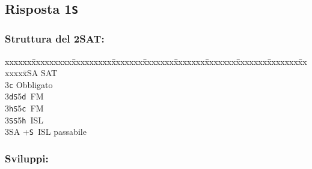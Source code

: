 \documentclass[a4paper,italian]{article}
\newcommand{\BS}{\small{\texttt{S}}}
\newcommand{\BC}{\small{\texttt{c}}}
\newcommand{\BD}{\small{\texttt{d}}}
\newcommand{\BH}{\small{\texttt{h}}}
\newcommand{\pdfs}{\texorpdfstring{\texttt{S}}{S}}
\newenvironment{bidtable}
{\begin{tabbing}

    xxxxxx\=xxxxxxxxx\=xxxxxxxxx\=xxxxxxx\=xxxxxxx\=xxxxxxx\=xxxxxxx\=xxxxxxx\=xxxxxxx\=xxxxxxx\=\kill}
{\end{tabbing} }%
\begin{document}
\begin{multicols}{2}
    \subsection{Risposta 1\pdfs}

    \subsubsection{Struttura del 2\small{SA}T:}

    \begin{bidtable}
        2\small{SA} \small{SA}T\+\\
        3\BC \> Obbligato\+\\
        3\BD {}\BS 5\BD\ FM\\
        3\BH {}\BS 5\BC\ FM\\
        3\BS {}\BS 5\BH\ ISL\\
        3\small{SA} +\BS\ ISL passabile\-\-
    \end{bidtable}

    \subsubsection{Sviluppi:}


\end{multicols}
\end{document}
